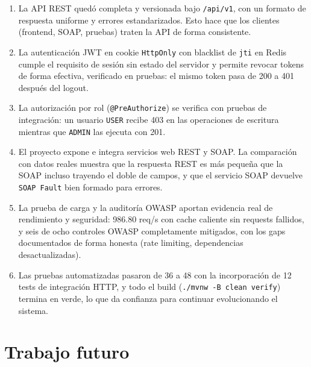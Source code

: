 \documentclass[12pt,a4paper]{article}
\begin{document}
\begin{enumerate}[leftmargin=1.2cm]
  \item La API REST quedó completa y versionada bajo \texttt{/api/v1}, con un formato de
        respuesta uniforme y errores estandarizados. Esto hace que los clientes (frontend,
        SOAP, pruebas) traten la API de forma consistente.
  \item La autenticación JWT en cookie \texttt{HttpOnly} con blacklist de \texttt{jti}
        en Redis cumple el requisito de sesión sin estado del servidor y permite revocar
        tokens de forma efectiva, verificado en pruebas: el mismo token pasa de 200 a 401
        después del logout.
  \item La autorización por rol (\texttt{@PreAuthorize}) se verifica con pruebas de
        integración: un usuario \texttt{USER} recibe 403 en las operaciones de escritura
        mientras que \texttt{ADMIN} las ejecuta con 201.
  \item El proyecto expone e integra servicios web REST y SOAP. La comparación con datos
        reales muestra que la respuesta REST es más pequeña que la SOAP incluso trayendo
        el doble de campos, y que el servicio SOAP devuelve \texttt{SOAP Fault} bien
        formado para errores.
  \item La prueba de carga y la auditoría OWASP aportan evidencia real de rendimiento y
        seguridad: 986.80 req/s con cache caliente sin requests fallidos, y seis de ocho
        controles OWASP completamente mitigados, con los gaps documentados de forma
        honesta (rate limiting, dependencias desactualizadas).
  \item Las pruebas automatizadas pasaron de 36 a 48 con la incorporación de 12 tests de
        integración HTTP, y todo el build (\texttt{./mvnw -B clean verify}) termina en
        verde, lo que da confianza para continuar evolucionando el sistema.
\end{enumerate}

\section{Trabajo futuro}
\end{document}
